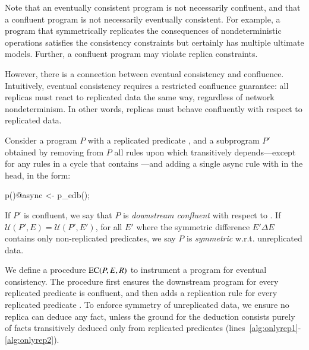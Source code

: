 Note that an eventually consistent program is not necessarily confluent, and that
a confluent program is not necessarily eventually consistent.  For example, a program
that symmetrically replicates the consequences of nondeterministic operations satisfies
the consistency constraints but certainly has multiple ultimate models.  Further, a confluent
program may violate replica constraints.

However, there is a connection between eventual consistency and confluence.  Intuitively, eventual consistency requires a restricted confluence guarantee: all replicas must react to replicated data the same way, regardless of network nondeterminism.  In other words, replicas must behave confluently with respect to replicated data.

\begin{definition}
Consider a \lang program $P$ with a replicated predicate , and a subprogram
$P'$ obtained by removing from $P$ all rules upon which  transitively
depends---except for any rules in a cycle that contains ---and adding a single async rule with  in the head, in the form:

\begin{Dedalus}
p()@async <- p_edb();
\end{Dedalus}
If $P'$ is confluent, we say that $P$ is {\em downstream confluent} with respect to .  
If $\mathcal{U}(P', E) = \mathcal{U}(P', E')$, for all $E'$ where the symmetric difference $E' \Delta E$ contains only non-replicated predicates, we say $P$ is {\em symmetric} w.r.t. unreplicated data.
\end{definition}


We define a procedure $\textsc{EC}(P, E, R)$ to instrument a program for eventual consistency.  The procedure first ensures the downstream program for every replicated predicate is confluent, and then adds a replication rule for every replicated predicate .  To enforce symmetry of unreplicated data, we ensure no replica can deduce any fact, unless the ground for the deduction consists purely of facts transitively deduced only from replicated predicates (lines~\ref{alg:onlyrep1}-\ref{alg:onlyrep2}).

